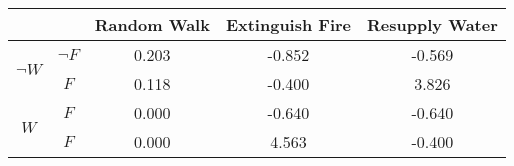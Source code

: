 \begin{center}
\begin{tabular}{|c|c|c|c|c|}
  \hline
  &   & Random Walk & Extinguish Fire & Resupply Water\\
  \hline
  \multirow{2}{*}{$\neg W$} & $\neg F$ & 0.203 & -0.852 & -0.569\\
  \cline{2-5}
   & $F$ & 0.118 & -0.400 & 3.826\\
  \hline
  \multirow{2}{*}{$W$} & $F$ & 0.000 & -0.640 & -0.640\\
  \cline{2-5}
   & $F$ & 0.000 & 4.563 & -0.400\\
  \hline
\end{tabular}
\end{center}
